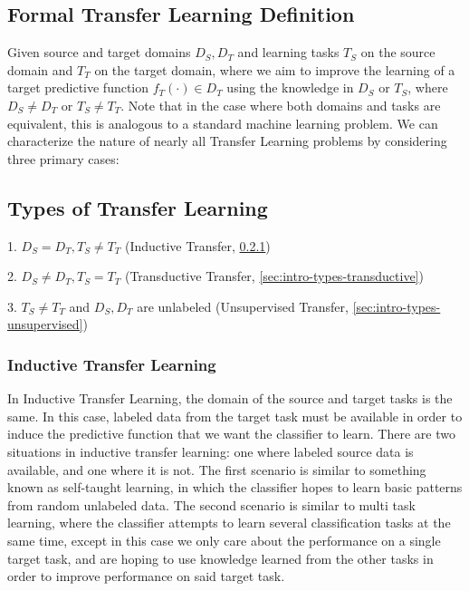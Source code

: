 \documentclass[10pt,twocolumn,letterpaper]{article}
\begin{document}
   \subsection{Formal Transfer Learning Definition} \label{sec:intro-def}
      Given source and target domains $D_S, D_T$ and learning tasks $T_S$ on the source domain and $T_T$ on the target
      domain, where we aim to improve the learning of a target predictive function $f_T(\cdot)\in D_T$ using
      the knowledge in $D_S$ or $T_S$, where $D_S\neq D_T$ or $T_S\neq T_T$. Note that in the case where both domains
      and tasks are equivalent, this is analogous to a standard machine learning problem. We can characterize the
      nature of nearly all Transfer Learning problems by considering three primary cases:

   \subsection{Types of Transfer Learning} \label{sec:intro-types}

      1. $D_S = D_T, T_S\neq T_T$ (Inductive Transfer, \ref{sec:intro-types-inductive})
    
      2. $D_S\neq D_T, T_S = T_T$ (Transductive Transfer, \ref{sec:intro-types-transductive})
    
      3. $T_S\neq T_T$ and $D_S, D_T$ are unlabeled (Unsupervised Transfer, \ref{sec:intro-types-unsupervised})
    
      \subsubsection{Inductive Transfer Learning} \label{sec:intro-types-inductive}
    
         In Inductive Transfer Learning, the domain of the source and target tasks is the same. In this case, labeled data
         from the target task must be available in order to induce the predictive function that we want the classifier to learn.
         There are two situations in inductive transfer learning: one where labeled source data is available, and one where it
         is not. The first scenario is similar to something known as self-taught learning, in which the classifier hopes to
         learn basic patterns from random unlabeled data. The second scenario is similar to multi task learning, where the
         classifier attempts to learn several classification tasks at the same time, except in this case we only care about
         the performance on a single target task, and are hoping to use knowledge learned from the other tasks in order to
         improve performance on said target task.
    
\end{document}
